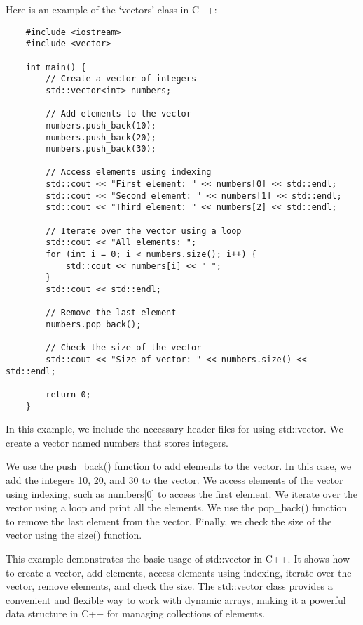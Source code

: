 \begin{solution}
    Here is an example of the `vectors' class in C++: \\
    \horizontalline
    \begin{verbatim}
    #include <iostream>
    #include <vector>
    
    int main() {
        // Create a vector of integers
        std::vector<int> numbers;
    
        // Add elements to the vector
        numbers.push_back(10);
        numbers.push_back(20);
        numbers.push_back(30);
    
        // Access elements using indexing
        std::cout << "First element: " << numbers[0] << std::endl;
        std::cout << "Second element: " << numbers[1] << std::endl;
        std::cout << "Third element: " << numbers[2] << std::endl;
    
        // Iterate over the vector using a loop
        std::cout << "All elements: ";
        for (int i = 0; i < numbers.size(); i++) {
            std::cout << numbers[i] << " ";
        }
        std::cout << std::endl;
    
        // Remove the last element
        numbers.pop_back();
    
        // Check the size of the vector
        std::cout << "Size of vector: " << numbers.size() << std::endl;
    
        return 0;
    }        
    \end{verbatim}
    
    \horizontalline

    In this example, we include the necessary header files for using std::vector. We create a vector named numbers that stores integers.

    \noindent We use the push\_back() function to add elements to the vector. In this case, we add the integers 10, 20, and 30 to the vector. We access elements of the vector using indexing, such as numbers[0] to access the first element. We iterate 
    over the vector using a loop and print all the elements. We use the pop\_back() function to remove the last element from the vector. Finally, we check the size of the vector using the size() function.

    \noindent This example demonstrates the basic usage of std::vector in C++. It shows how to create a vector, add elements, access elements using indexing, iterate over the vector, remove elements, and check the size. The std::vector class 
    provides a convenient and flexible way to work with dynamic arrays, making it a powerful data structure in C++ for managing collections of elements.
\end{solution}

